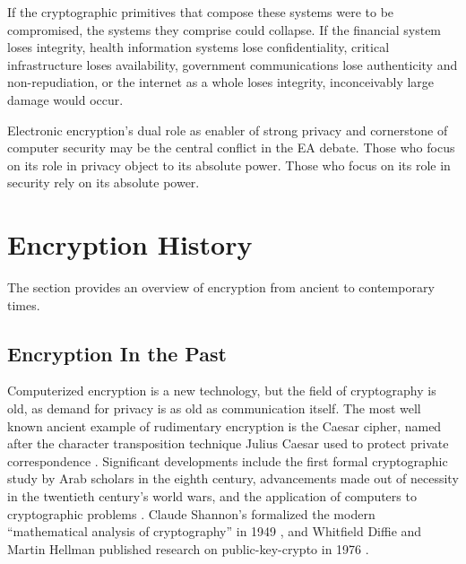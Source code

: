 
If the cryptographic primitives that compose these systems were to be compromised, the systems they comprise could
collapse. If the financial system loses integrity, health information systems lose confidentiality, critical
infrastructure loses availability, government communications lose authenticity and non-repudiation, or the internet as a
whole loses integrity, inconceivably large damage would occur.

Electronic encryption's dual role as enabler of strong privacy and cornerstone of computer security may be the central
conflict in the EA debate. Those who focus on its role in privacy object to its absolute power. Those who focus on its
role in security rely on its absolute power.



\section{Encryption History}
\label{sec-crypto-history}

The section provides an overview of encryption from ancient to contemporary times.

\subsection{Encryption In the Past}
\label{sec-history-old}

Computerized encryption is a new technology, but the field of cryptography is old, as demand for privacy is as old as
communication itself. The most well known ancient example of rudimentary encryption is the Caesar cipher, named after
the character transposition technique Julius Caesar used to protect private correspondence
\cite{luciano_cryptology_1987}. Significant developments include the first formal cryptographic study by Arab scholars
in the eighth century, advancements made out of necessity in the twentieth century's world wars, and the application of
computers to cryptographic problems \cite{kahn_codebreakers_1996}. Claude Shannon's formalized the modern ``mathematical
analysis of cryptography'' in 1949 \cite{shannon_communication_1949}, and Whitfield Diffie and Martin Hellman published
research on \ac{public-key-crypto} in 1976 \cite{diffie_new_1976}.

